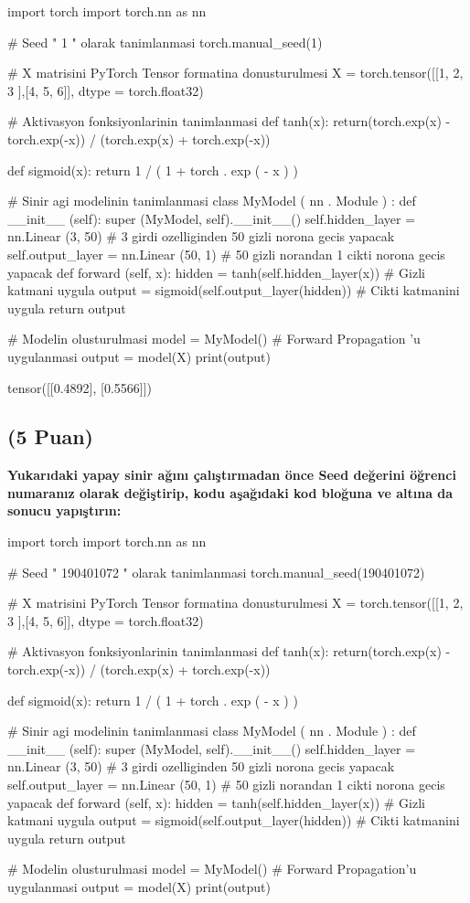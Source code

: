 \documentclass[11pt]{article}
\begin{document}
\begin{python}
import torch
import torch.nn as nn

# Seed " 1 " olarak tanimlanmasi
torch.manual_seed(1)

# X matrisini PyTorch Tensor formatina donusturulmesi
X = torch.tensor([[1, 2, 3 ],[4, 5, 6]], dtype = torch.float32)

# Aktivasyon fonksiyonlarinin tanimlanmasi
def tanh(x):
  return(torch.exp(x) - torch.exp(-x)) / (torch.exp(x) + torch.exp(-x))

def sigmoid(x):
  return 1 / ( 1 + torch . exp ( - x ) )

# Sinir agi modelinin tanimlanmasi
class MyModel ( nn . Module ) :
  def __init__ (self):
    super (MyModel, self).__init__()
    self.hidden_layer = nn.Linear (3, 50) # 3 girdi ozelliginden 50 gizli norona gecis yapacak
    self.output_layer = nn.Linear (50, 1) # 50 gizli norandan 1 cikti norona gecis yapacak
  def forward (self, x):
    hidden = tanh(self.hidden_layer(x)) # Gizli katmani uygula
    output = sigmoid(self.output_layer(hidden)) # Cikti katmanini uygula
    return output
    
# Modelin olusturulmasi
model = MyModel()
# Forward Propagation ’u uygulanmasi
output = model(X)
print(output)
\end{python}

tensor([[0.4892],
        [0.5566]])

\subsection{(5 Puan)} \textbf{Yukarıdaki yapay sinir ağını çalıştırmadan önce Seed değerini öğrenci numaranız olarak değiştirip, kodu aşağıdaki kod bloğuna ve altına da sonucu yapıştırın:}

\begin{python}
import torch
import torch.nn as nn

# Seed " 190401072 " olarak tanimlanmasi
torch.manual_seed(190401072)

# X matrisini PyTorch Tensor formatina donusturulmesi
X = torch.tensor([[1, 2, 3 ],[4, 5, 6]], dtype = torch.float32)

# Aktivasyon fonksiyonlarinin tanimlanmasi
def tanh(x):
  return(torch.exp(x) - torch.exp(-x)) / (torch.exp(x) + torch.exp(-x))

def sigmoid(x):
  return 1 / ( 1 + torch . exp ( - x ) )

# Sinir agi modelinin tanimlanmasi
class MyModel ( nn . Module ) :
  def __init__ (self):
    super (MyModel, self).__init__()
    self.hidden_layer = nn.Linear (3, 50) # 3 girdi ozelliginden 50 gizli norona gecis yapacak
    self.output_layer = nn.Linear (50, 1) # 50 gizli norandan 1 cikti norona gecis yapacak
  def forward (self, x):
    hidden = tanh(self.hidden_layer(x)) # Gizli katmani uygula
    output = sigmoid(self.output_layer(hidden)) # Cikti katmanini uygula
    return output
    
# Modelin olusturulmasi
model = MyModel()
# Forward Propagation’u uygulanmasi
output = model(X)
print(output)
\end{python}
\end{document}
